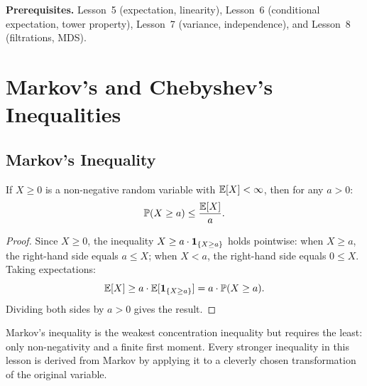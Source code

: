 \documentclass[11pt,a4paper]{article}
\begin{document}
\medskip
\noindent\textbf{Prerequisites.}
Lesson~5 (expectation, linearity), Lesson~6 (conditional
expectation, tower property), Lesson~7 (variance, independence),
and Lesson~8 (filtrations, MDS).


\section{Markov's and Chebyshev's Inequalities}
\label{sec:markov_chebyshev}

\subsection{Markov's Inequality}
\label{subsec:markov}

\begin{keyresult}[title={Markov's Inequality}]
\begin{theorem}
\label{thm:markov}
If $X \geq 0$ is a non-negative random variable with
$\mathbb{E}[X] < \infty$, then for any $a > 0$:
\begin{equation}
  \mathbb{P}(X \geq a) \leq \frac{\mathbb{E}[X]}{a}.
  \label{eq:markov}
\end{equation}
\end{theorem}
\end{keyresult}

\begin{proof}
Since $X \geq 0$, the inequality
$X \geq a \cdot \mathbf{1}_{\{X \geq a\}}$ holds pointwise: when
$X \geq a$, the right-hand side equals $a \leq X$; when $X < a$,
the right-hand side equals $0 \leq X$.  Taking expectations:
\begin{equation}
  \mathbb{E}[X] \geq a \cdot \mathbb{E}[\mathbf{1}_{\{X \geq a\}}]
  = a \cdot \mathbb{P}(X \geq a).
  \label{eq:markov_proof}
\end{equation}
Dividing both sides by $a > 0$ gives the result.
\end{proof}

\begin{remark}
Markov's inequality is the weakest concentration inequality but
requires the least: only non-negativity and a finite first
moment.  Every stronger inequality in this lesson is derived
from Markov by applying it to a cleverly chosen transformation
of the original variable.
\end{remark}
\end{document}
